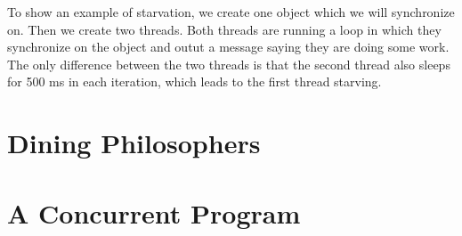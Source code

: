 \documentclass{article}
\begin{document}
  To show an example of starvation, we create one object which we will synchronize on. Then we create two threads. Both threads are running a loop in which they synchronize on the object and outut a message saying they are doing some work. The only difference between the two threads is that the second thread also sleeps for 500 ms in each iteration, which leads to the first thread starving.

  \section{Dining Philosophers}


  \section{A Concurrent Program}
\end{document}
